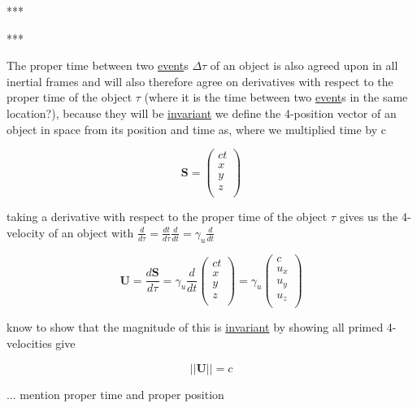 ***

***

The proper time between two \hyperlink{def-event}{event}s $\Delta\tau$ of an object is also agreed upon in all inertial frames and will also therefore agree on derivatives with respect to the proper time of the object $\tau$ (where it is the time between two \hyperlink{def-event}{event}s in the same location?), because they will be \hyperlink{def-lorentz-invariant}{invariant}
we define the 4-position vector of an object in space from its position and time as, where we multiplied time by c

\begin{equation}
	\mathbf{S} =
	\begin{pmatrix}
		ct \\
		x  \\
		y  \\
		z  \\
	\end{pmatrix}
\end{equation}

taking a derivative with respect to the proper time of the object $\tau$ gives us the 4-velocity of an object with $\frac{d}{d\tau} = \frac{dt}{d\tau}\frac{d}{dt} = \gamma_u \frac{d}{dt} $

\begin{equation}
	\mathbf{U} = \frac{d\mathbf{S}}{d\tau} = \gamma_u \frac{d}{dt}
	\begin{pmatrix}
		ct \\
		x  \\
		y  \\
		z  \\
	\end{pmatrix}
	= \gamma_u
	\begin{pmatrix}
		c   \\
		u_x \\
		u_y \\
		u_z \\
	\end{pmatrix}
\end{equation}

know to show that the magnitude of this is \hyperlink{def-lorentz-invariant}{invariant} by showing all primed 4-velocities give

\begin{equation}
	||\mathbf{U}|| = c
\end{equation}

... mention proper time and proper position


